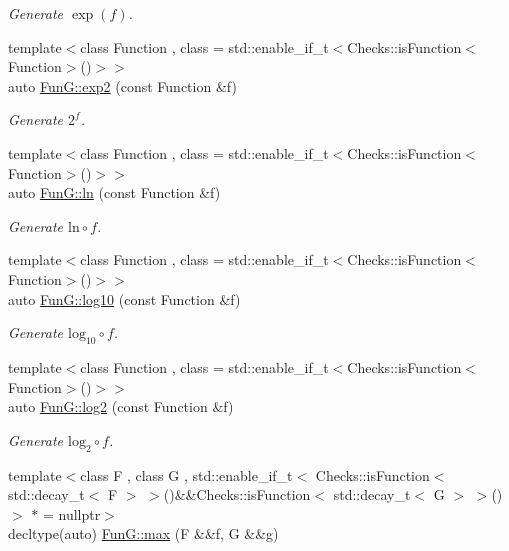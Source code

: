 \begin{DoxyCompactItemize}
\begin{DoxyCompactList}\small\item\em Generate $ \exp(f) $. \end{DoxyCompactList}\item 
{\footnotesize template$<$class Function , class  = std\+::enable\+\_\+if\+\_\+t$<$\+Checks\+::is\+Function$<$\+Function$>$()$>$$>$ }\\auto \hyperlink{group__CMathGroup_ga7724faf7db6e9583ac91df322c26ecf5}{Fun\+G\+::exp2} (const Function \&f)
\begin{DoxyCompactList}\small\item\em Generate $2^f$. \end{DoxyCompactList}\item 
{\footnotesize template$<$class Function , class  = std\+::enable\+\_\+if\+\_\+t$<$\+Checks\+::is\+Function$<$\+Function$>$()$>$$>$ }\\auto \hyperlink{group__CMathGroup_ga31313571b08f65b853643e14fc8fc714}{Fun\+G\+::ln} (const Function \&f)
\begin{DoxyCompactList}\small\item\em Generate $ \mathrm{ln}\circ f $. \end{DoxyCompactList}\item 
{\footnotesize template$<$class Function , class  = std\+::enable\+\_\+if\+\_\+t$<$\+Checks\+::is\+Function$<$\+Function$>$()$>$$>$ }\\auto \hyperlink{group__CMathGroup_gae9506f4e0e6fad4f756f636044697bfe}{Fun\+G\+::log10} (const Function \&f)
\begin{DoxyCompactList}\small\item\em Generate $ \mathrm{log}_{10}\circ f $. \end{DoxyCompactList}\item 
{\footnotesize template$<$class Function , class  = std\+::enable\+\_\+if\+\_\+t$<$\+Checks\+::is\+Function$<$\+Function$>$()$>$$>$ }\\auto \hyperlink{group__CMathGroup_gacd6be7e9de7bbd54c852f0acf0c7d2c2}{Fun\+G\+::log2} (const Function \&f)
\begin{DoxyCompactList}\small\item\em Generate $ \mathrm{log}_{2}\circ f $. \end{DoxyCompactList}\item 
{\footnotesize template$<$class F , class G , std\+::enable\+\_\+if\+\_\+t$<$ Checks\+::is\+Function$<$ std\+::decay\+\_\+t$<$ F $>$ $>$()\&\&\+Checks\+::is\+Function$<$ std\+::decay\+\_\+t$<$ G $>$ $>$() $>$ $\ast$  = nullptr$>$ }\\decltype(auto) \hyperlink{group__CMathGroup_ga012e475862c540ed8a2a083414cb2917}{Fun\+G\+::max} (F \&\&f, G \&\&g)

\end{DoxyCompactItemize}
